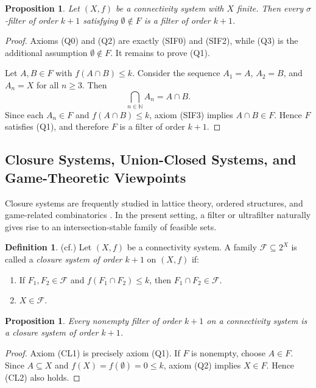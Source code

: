 \documentclass[10pt]{book}
\newtheorem{proposition}[theorem]{Proposition}
\theoremstyle{definition}
\newtheorem{definition}[theorem]{Definition}
\begin{document}
\begin{proposition}
Let \((X,f)\) be a connectivity system with \(X\) finite.  
Then every \(\sigma\)-filter of order \(k+1\) satisfying \(\emptyset\notin F\) is a filter of order \(k+1\).
\end{proposition}

\begin{proof}
Axioms (Q0) and (Q2) are exactly (SIF0) and (SIF2), while (Q3) is the additional assumption \(\emptyset\notin F\).  
It remains to prove (Q1).

Let \(A,B\in F\) with \(f(A\cap B)\leq k\).  
Consider the sequence \(A_1=A\), \(A_2=B\), and \(A_n=X\) for all \(n\geq 3\).  
Then
\[
\bigcap_{n\in\mathbb{N}} A_n = A\cap B.
\]
Since each \(A_n\in F\) and \(f(A\cap B)\leq k\), axiom (SIF3) implies \(A\cap B\in F\).  
Hence \(F\) satisfies (Q1), and therefore \(F\) is a filter of order \(k+1\).
\end{proof}

\subsection{Closure Systems, Union-Closed Systems, and Game-Theoretic Viewpoints}

Closure systems are frequently studied in lattice theory, ordered structures, and game-related combinatorics \cite{caspard2003lattices,adaricheva2013ordered}.  
In the present setting, a filter or ultrafilter naturally gives rise to an intersection-stable family of feasible sets.

\begin{definition}(cf.\cite{caspard2003lattices})
Let \((X,f)\) be a connectivity system.  
A family \(\mathcal{F}\subseteq 2^X\) is called a \emph{closure system of order \(k+1\)} on \((X,f)\) if:
\begin{enumerate}
    \item[(CL1)] If \(F_1,F_2\in \mathcal{F}\) and \(f(F_1\cap F_2)\leq k\), then \(F_1\cap F_2\in \mathcal{F}\).
    \item[(CL2)] \(X\in \mathcal{F}\).
\end{enumerate}
\end{definition}

\begin{proposition}
Every nonempty filter of order \(k+1\) on a connectivity system is a closure system of order \(k+1\).
\end{proposition}

\begin{proof}
Axiom (CL1) is precisely axiom (Q1).  
If \(F\) is nonempty, choose \(A\in F\). Since \(A\subseteq X\) and \(f(X)=f(\emptyset)=0\leq k\), axiom (Q2) implies \(X\in F\).  
Hence (CL2) also holds.
\end{proof}
\end{document}
